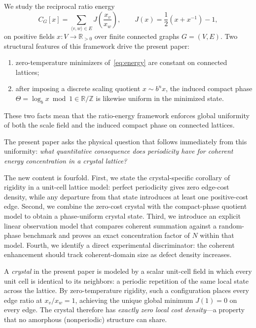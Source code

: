 \documentclass[prb,twocolumn,nofootinbib,superscriptaddress]{revtex4-2}
\newcommand{\R}{\mathbb{R}}
\newcommand{\Rp}{\mathbb{R}_{>0}}
\newcommand{\Z}{\mathbb{Z}}
\newcommand{\J}{J}
\begin{document}
We study the reciprocal ratio energy
\begin{equation}
C_G[x] = \sum_{\langle v,w \rangle \in E} \J\!\left(\frac{x_v}{x_w}\right),
\qquad \J(x) = \frac12\!\left(x + x^{-1}\right) - 1,
\label{eq:energy}
\end{equation}
on positive fields $x: V \to \Rp$ over finite connected graphs $G = (V,E)$.
Two structural features of this framework drive the present paper:
\begin{enumerate}
\item zero-temperature minimizers of~\eqref{eq:energy} are constant on connected lattices;
\item after imposing a discrete scaling quotient $x \sim b^n x$, the induced compact phase $\Theta = \log_b x \bmod 1 \in \R/\Z$ is likewise uniform in the minimized state.
\end{enumerate}
These two facts mean that the ratio-energy framework enforces global uniformity of both the scale field and the induced compact phase on connected lattices.

The present paper asks the physical question that follows immediately from this uniformity: \emph{what quantitative consequence does periodicity have for coherent energy concentration in a crystal lattice?}

The new content is fourfold.
First, we state the crystal-specific corollary of rigidity in a unit-cell lattice model: perfect periodicity gives zero edge-cost density, while any departure from that state introduces at least one positive-cost edge.
Second, we combine the zero-cost crystal with the compact-phase quotient model to obtain a phase-uniform crystal state.
Third, we introduce an explicit linear observation model that compares coherent summation against a random-phase benchmark and proves an exact concentration factor of $N$ within that model.
Fourth, we identify a direct experimental discriminator: the coherent enhancement should track coherent-domain size as defect density increases.

A \emph{crystal} in the present paper is modeled by a scalar unit-cell field in which every unit cell is identical to its neighbors: a periodic repetition of the same local state across the lattice.
By zero-temperature rigidity, such a configuration places every edge ratio at $x_v/x_w = 1$, achieving the unique global minimum $\J(1) = 0$ on every edge.
The crystal therefore has \emph{exactly zero local cost density}---a property that no amorphous (nonperiodic) structure can share.
\end{document}
